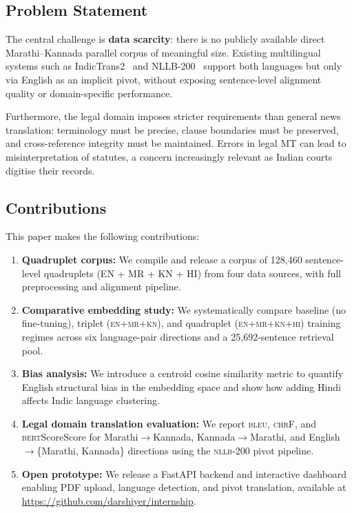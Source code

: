 \documentclass[11pt,a4paper]{article}
\newcommand{\mr}{\textsc{mr}}
\newcommand{\kn}{\textsc{kn}}
\newcommand{\en}{\textsc{en}}
\newcommand{\hi}{\textsc{hi}}
\newcommand{\bleu}{\textsc{bleu}}
\newcommand{\chrf}{\textsc{chr}F}
\newcommand{\bert}{\textsc{bert}Score}
\newcommand{\nllb}{\textsc{nllb}-200}
\begin{document}
\subsection{Problem Statement}
The central challenge is \textbf{data scarcity}: there is no publicly
available direct Marathi--Kannada parallel corpus of meaningful size.
Existing multilingual systems such as IndicTrans2~\cite{gala2023indictrans2}
and NLLB-200~\cite{nllb2022} support both languages but only via
English as an implicit pivot, without exposing sentence-level
alignment quality or domain-specific performance.

Furthermore, the legal domain imposes stricter requirements than
general news translation: terminology must be precise, clause
boundaries must be preserved, and cross-reference integrity must
be maintained.
Errors in legal MT can lead to misinterpretation of statutes,
a concern increasingly relevant as Indian courts digitise their records.

\subsection{Contributions}
This paper makes the following contributions:

\begin{enumerate}[leftmargin=*, label=\textbf{C\arabic*.}]
  \item \textbf{Quadruplet corpus:} We compile and release a
    corpus of 128,460 sentence-level quadruplets
    (EN + MR + KN + HI) from four data sources, with
    full preprocessing and alignment pipeline.

  \item \textbf{Comparative embedding study:}
    We systematically compare baseline (no fine-tuning),
    triplet (\en+\mr+\kn), and quadruplet (\en+\mr+\kn+\hi)
    training regimes across six language-pair directions and
    a 25,692-sentence retrieval pool.

  \item \textbf{Bias analysis:}
    We introduce a centroid cosine similarity metric to quantify
    English structural bias in the embedding space and show how
    adding Hindi affects Indic language clustering.

  \item \textbf{Legal domain translation evaluation:}
    We report \bleu{}, \chrf{}, and \bert{}Score for
    Marathi$\rightarrow$Kannada, Kannada$\rightarrow$Marathi, and
    English$\rightarrow$\{Marathi, Kannada\} directions using the
    \nllb{} pivot pipeline.

  \item \textbf{Open prototype:}
    We release a FastAPI backend and interactive dashboard
    enabling PDF upload, language detection, and pivot translation,
    available at \url{https://github.com/darshiyer/internship}.
\end{enumerate}
\end{document}
